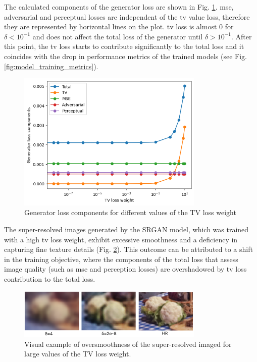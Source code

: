 \documentclass[conference]{IEEEtran}
\begin{document}
The calculated components of the generator loss are shown in Fig. \ref{fig:tv_loss_components}. \acrshort{mse}, adversarial and perceptual losses are independent of the \acrshort{tv} value loss, therefore they are represented by horizontal lines on the plot. \Acrshort{tv} loss is almost 0 for $\delta < 10^{-1}$ and does not affect the total loss of the generator until $\delta > 10^{-1}$. After this point, the \acrshort{tv} loss starts to contribute significantly to the total loss and it coincides with the drop in performance metrics of the trained models (see Fig. \ref{fig:model_training_metrics}).

\begin{figure}[htb]
	\centering
    \centerline{\includegraphics[width=8.9cm]{results/tv_loss_components}}
	\caption{Generator loss components for different values of the TV loss weight}
	\label{fig:tv_loss_components}
\end{figure}

The super-resolved images generated by the SRGAN model, which was trained with a high \acrlong{tv} loss weight, exhibit excessive smoothness and a deficiency in capturing fine texture details (Fig. \ref{fig:tv_smooth_comparison}). This outcome can be attributed to a shift in the training objective, where the components of the total loss that assess image quality (such as \acrshort{mse} and perception losses) are overshadowed by \acrshort{tv} loss contribution to the total loss.

\begin{figure}[htb]
	\centering
    \centerline{\includegraphics[width=8.9cm]{results/tv_smooth_comparison}}
	\caption{Visual example of oversmoothness of the super-resolved imaged for large values of the TV loss weight.}
	\label{fig:tv_smooth_comparison}
\end{figure}
\end{document}
